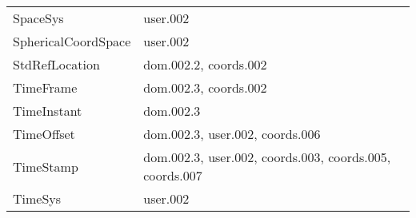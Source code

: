 \begin{longtable}[l]{|l|l|}
        SpaceSys                          & user.002                                    \\
        SphericalCoordSpace               & user.002                                    \\
        StdRefLocation                    & dom.002.2, coords.002                       \\
        TimeFrame                         & dom.002.3, coords.002                       \\
        TimeInstant                       & dom.002.3                                   \\
        TimeOffset                        & dom.002.3, user.002, coords.006             \\
        TimeStamp                         & dom.002.3, user.002, coords.003, coords.005, coords.007 \\
        TimeSys                           & user.002                                    \\

  \hline
\end{longtable}
\normalsize
